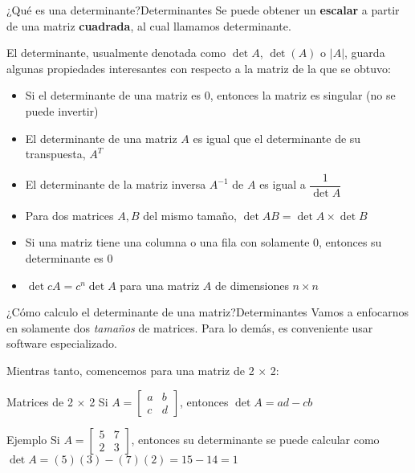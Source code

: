 \documentclass[spanish, c]{beamer}
\begin{document}
\begin{frame}{¿Qué es una determinante?}{Determinantes}
    Se puede obtener un \textbf{escalar} a partir de una matriz \textbf{cuadrada}, al cual llamamos \alert{determinante}.

    El determinante, usualmente denotada como $\det A$, $\det(A)$ o $|A|$, guarda algunas propiedades interesantes con respecto a la matriz de la que se obtuvo: \pause

    \begin{itemize}[<+->]
        \item Si el determinante de una matriz es 0, entonces la matriz es singular (no se puede invertir)
        \item El determinante de una matriz $A$ es igual que el determinante de su transpuesta, $A^T$
        \item El determinante de la matriz inversa $A^{-1}$ de $A$ es igual a $\dfrac{1}{\det A}$
        \item Para dos matrices $A, B$ del mismo tamaño, $\det AB = \det A \times \det B$
        \item Si una matriz tiene una columna o una fila con solamente 0, entonces su determinante es 0
        \item $\det cA = c^n \det A$ para una matriz $A$ de dimensiones $n \times n$
    \end{itemize}
\end{frame}

\begin{frame}{¿Cómo calculo el determinante de una matriz?}{Determinantes}
    Vamos a enfocarnos en solamente dos \textit{tamaños} de matrices. Para lo demás, es conveniente usar software especializado.
    
    Mientras tanto, comencemos para una matriz de 2 $\times$ 2: \pause

\begin{block}{Matrices de 2 $\times$ 2}
    Si $A = \begin{bmatrix*} a & b \\ c & d \end{bmatrix*}$, entonces $\det A = ad - cb$
\end{block} \pause

\begin{exampleblock}{Ejemplo}
    Si $A = \begin{bmatrix}5 & 7 \\ 2 & 3 \end{bmatrix}$,
        entonces su determinante se puede calcular como
        $\det A = (5)(3) - (7)(2) = 15 - 14 = 1$
\end{exampleblock}

\end{frame}
\end{document}

